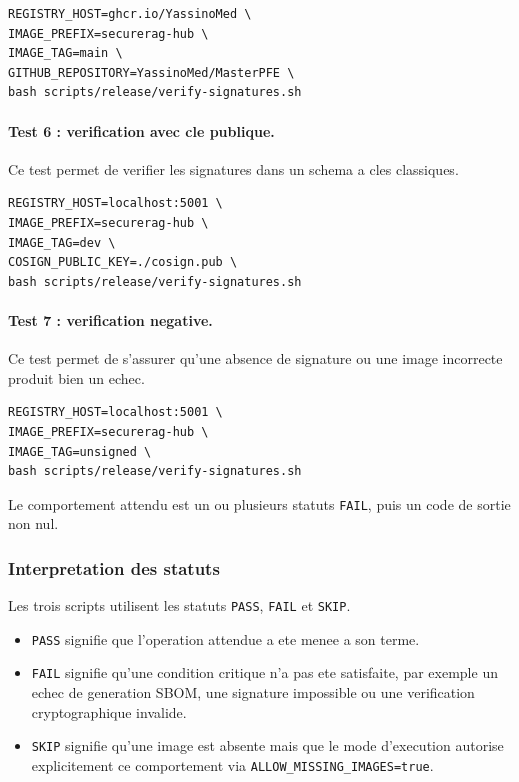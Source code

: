 \begin{verbatim}
REGISTRY_HOST=ghcr.io/YassinoMed \
IMAGE_PREFIX=securerag-hub \
IMAGE_TAG=main \
GITHUB_REPOSITORY=YassinoMed/MasterPFE \
bash scripts/release/verify-signatures.sh
\end{verbatim}

\paragraph{Test 6 : verification avec cle publique.}
Ce test permet de verifier les signatures dans un schema a cles classiques.

\begin{verbatim}
REGISTRY_HOST=localhost:5001 \
IMAGE_PREFIX=securerag-hub \
IMAGE_TAG=dev \
COSIGN_PUBLIC_KEY=./cosign.pub \
bash scripts/release/verify-signatures.sh
\end{verbatim}

\paragraph{Test 7 : verification negative.}
Ce test permet de s'assurer qu'une absence de signature ou une image incorrecte produit bien un echec.

\begin{verbatim}
REGISTRY_HOST=localhost:5001 \
IMAGE_PREFIX=securerag-hub \
IMAGE_TAG=unsigned \
bash scripts/release/verify-signatures.sh
\end{verbatim}

Le comportement attendu est un ou plusieurs statuts \texttt{FAIL}, puis un code de sortie non nul.

\subsubsection{Interpretation des statuts}

Les trois scripts utilisent les statuts \texttt{PASS}, \texttt{FAIL} et \texttt{SKIP}.

\begin{itemize}
  \item \texttt{PASS} signifie que l'operation attendue a ete menee a son terme.
  \item \texttt{FAIL} signifie qu'une condition critique n'a pas ete satisfaite, par exemple un echec de generation SBOM, une signature impossible ou une verification cryptographique invalide.
  \item \texttt{SKIP} signifie qu'une image est absente mais que le mode d'execution autorise explicitement ce comportement via \texttt{ALLOW\_MISSING\_IMAGES=true}.
\end{itemize}

